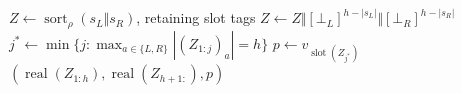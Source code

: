 \algcolstart
\begin{algorithm}[H]
\caption{Node Replay}
\label{alg:replay_segment_node}
$Z\leftarrow\operatorname{sort}_\rho(s_L\Vert s_R)$, retaining slot tags\;
$Z\leftarrow Z\Vert[\bot_L]^{h-|s_L|}\Vert[\bot_R]^{h-|s_R|}$\;
$j^*\leftarrow\min\{j:\max_{a\in\{L,R\}}|(Z_{1:j})_a|=h\}$\;
$p\leftarrow v_{\operatorname{slot}(Z_{j^*})}$\;
\Return $(\operatorname{real}(Z_{1:h}),\operatorname{real}(Z_{h+1:}),p)$\;
\end{algorithm}
\algcolend

